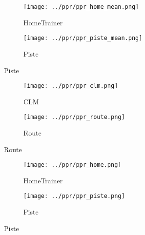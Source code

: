 \documentclass{beamer}
\begin{document}
\begin{frame}
    \begin{figure}
        \centering
        \begin{subfigure}{0.7\textwidth}
            \centering
            \texttt{[image: ../ppr/ppr\_home\_mean.png]}
            \caption{HomeTrainer}
        \end{subfigure}

        \begin{subfigure}{0.7\textwidth}
            \centering
            \texttt{[image: ../ppr/ppr\_piste\_mean.png]}
            \caption{Piste}
        \end{subfigure}

    \end{figure}
\end{frame}


\begin{frame}
    \begin{figure}
        \centering
        \begin{subfigure}{0.7\textwidth}
            \centering
            \texttt{[image: ../ppr/ppr\_clm.png]}
            \caption{CLM}
        \end{subfigure}
        \begin{subfigure}{0.7\textwidth}
            \centering
            \texttt{[image: ../ppr/ppr\_route.png]}
            \caption{Route}
        \end{subfigure}
    \end{figure}
\end{frame}
\begin{frame}

    \begin{figure}
        \centering
        \begin{subfigure}{0.7\textwidth}
            \centering
            \texttt{[image: ../ppr/ppr\_home.png]}
            \caption{HomeTrainer}
        \end{subfigure}

        \begin{subfigure}{0.7\textwidth}
            \centering
            \texttt{[image: ../ppr/ppr\_piste.png]}
            \caption{Piste}
        \end{subfigure}

    \end{figure}
\end{frame}
\end{document}
